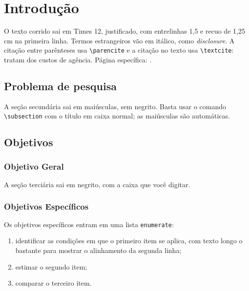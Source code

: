 \documentclass[12pt,a4paper]{article}
\begin{document}
\capa
\folhaderosto
\sumario

\section{Introdução}

O texto corrido sai em Times 12, justificado, com entrelinhas 1,5 e recuo de
1,25 cm na primeira linha. Termos estrangeiros vão em itálico, como
\textit{disclosure}. A citação entre parênteses usa \verb|\parencite|
\parencite{jensen1976,dickinson2011} e a citação no texto usa \verb|\textcite|:
\textcite{jensen1976} tratam dos custos de agência. Página específica:
\parencite[p.~310]{jensen1976}.

\subsection{Problema de pesquisa}

A seção secundária sai em maiúsculas, sem negrito. Basta usar o comando
\verb|\subsection| com o título em caixa normal; as maiúsculas são automáticas.

\subsection{Objetivos}

\subsubsection{Objetivo Geral}

A seção terciária sai em negrito, com a caixa que você digitar.

\subsubsection{Objetivos Específicos}

Os objetivos específicos entram em uma lista \verb|enumerate|:
\begin{enumerate}
  \item identificar as condições em que o primeiro item se aplica, com texto
        longo o bastante para mostrar o alinhamento da segunda linha;
  \item estimar o segundo item;
  \item comparar o terceiro item.
\end{enumerate}
\end{document}

